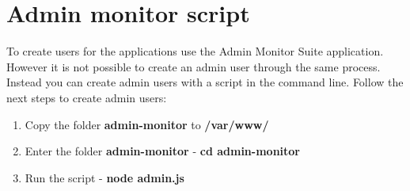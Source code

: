 \section{Admin monitor script}

To create users for the applications use the Admin Monitor Suite application. However it is not possible to create an admin user through the same process. Instead you can create admin users with a script in the command line. Follow the next steps to create admin users:

\begin{enumerate}
    \item Copy the folder \textbf{admin-monitor} to \textbf{/var/www/}
    \item Enter the folder \textbf{admin-monitor} - \textbf{cd admin-monitor}
    \item Run the script - \textbf{node admin.js}
\end{enumerate}

